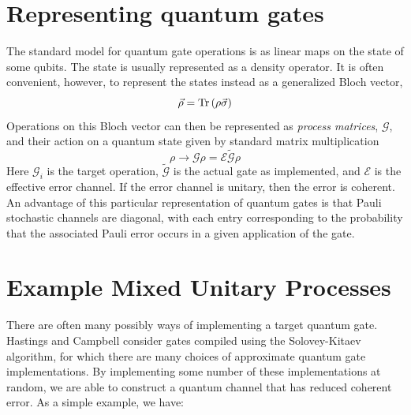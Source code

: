 \documentclass[aps,nofootinbib,pra,notitlepage,twocolumn]{revtex4-1}
\newcommand{\tr}{{\rm Tr\thinspace}}
\newcommand{\actual}{\ensuremath{\tilde{\mathcal{G}}}}
\newcommand{\target}{\ensuremath{{\mathcal{G}}}}
\newcommand{\error}{\ensuremath{{\mathcal{E}}}}
\begin{document}
\section{Representing quantum gates}
\label{sec:representing_quantum_gates}
The standard model for quantum gate operations is as linear maps on the state of some qubits. The state is usually represented as a density operator. It is often convenient, however, to represent the states instead as a generalized Bloch vector,
\begin{equation}
  \vec \rho = \tr(\rho \vec \sigma)
\end{equation}
Operations on this Bloch vector can then be represented as \emph{process matrices}, $\target$, and their action on a quantum state given by standard matrix multiplication
\begin{equation}
  \rho \rightarrow \target\rho = \error \actual \rho
\end{equation}
Here $\target_i$ is the target operation, $\actual$ is the actual gate as implemented, and $\error$ is the effective error channel. If the error channel is unitary, then the error is coherent. An advantage of this particular representation of quantum gates is that Pauli stochastic channels are diagonal, with each entry corresponding to the probability that the associated Pauli error occurs in a given application of the gate.

\section{Example Mixed Unitary Processes}
\label{sec:mixed_unitary_processes}
There are often many possibly ways of implementing a target quantum gate. Hastings and Campbell consider gates compiled using the Solovey-Kitaev algorithm, for which there are many choices of approximate quantum gate implementations. By implementing some number of these implementations at random, we are able to construct a quantum channel that has reduced coherent error. As a simple example, we have:
\end{document}
